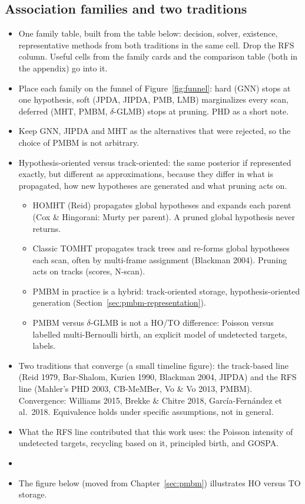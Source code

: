 \subsection{Association families and two traditions}
\label{sec:families}
\begin{itemize}
    \item One family table, built from the table below: decision, solver, existence, representative methods from both traditions in the same cell. Drop the RFS column. Useful cells from the family cards and the comparison table (both in the appendix) go into it.
    \item Place each family on the funnel of Figure~\ref{fig:funnel}: hard (GNN) stops at one hypothesis, soft (JPDA, JIPDA, PMB, LMB) marginalizes every scan, deferred (MHT, PMBM, $\delta$-GLMB) stops at pruning. PHD as a short note.
    \item Keep GNN, JIPDA and MHT as the alternatives that were rejected, so the choice of PMBM is not arbitrary.
    \item Hypothesis-oriented versus track-oriented: the same posterior if represented exactly, but different as approximations, because they differ in what is propagated, how new hypotheses are generated and what pruning acts on.
    \begin{itemize}
        \item HOMHT (Reid) propagates global hypotheses and expands each parent (Cox \& Hingorani: Murty per parent). A pruned global hypothesis never returns.
        \item Classic TOMHT propagates track trees and re-forms global hypotheses each scan, often by multi-frame assignment (Blackman 2004). Pruning acts on tracks (scores, N-scan).
        \item PMBM in practice is a hybrid: track-oriented storage, hypothesis-oriented generation (Section~\ref{sec:pmbm-representation}).
        \item PMBM versus $\delta$-GLMB is not a HO/TO difference: Poisson versus labelled multi-Bernoulli birth, an explicit model of undetected targets, labels.
    \end{itemize}
    \item Two traditions that converge (a small timeline figure): the track-based line (Reid 1979, Bar-Shalom, Kurien 1990, Blackman 2004, JIPDA) and the RFS line (Mahler's PHD 2003, CB-MeMBer, Vo \& Vo 2013, PMBM). Convergence: Williams 2015, Brekke \& Chitre 2018, Garc\'ia-Fern\'andez et al.\ 2018. Equivalence holds under specific assumptions, not in general.
    \item What the RFS line contributed that this work uses: the Poisson intensity of undetected targets, recycling based on it, principled birth, and GOSPA.
    \item {}
    \item The figure below (moved from Chapter~\ref{sec:pmbm}) illustrates HO versus TO storage.
\end{itemize}

